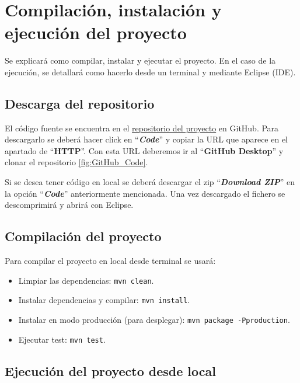 
\section{Compilación, instalación y ejecución del proyecto}

Se explicará como compilar, instalar y ejecutar el proyecto. En el caso de
la ejecución, se detallará como hacerlo desde un terminal y mediante Eclipse (IDE).

\subsection{Descarga del repositorio}
El código fuente se encuentra en el \href{https://github.com/drg1006/Gestor-TFG-2022.git}{repositorio del proyecto} en GitHub. Para descargarlo se deberá hacer click en ``\textbf{\textit{Code}}'' y copiar la URL que aparece en el apartado de ``\textbf{HTTP}''. Con esta URL deberemos ir al ``\textbf{GitHub Desktop}'' y clonar el repositorio \ref{fig:GitHub_Code}.


Si se desea tener código en local se deberá descargar el zip ``\textbf{\textit{Download ZIP}}'' en la opción ``\textbf{\textit{Code}}'' anteriormente mencionada. Una vez descargado el fichero se descomprimirá y abrirá con Eclipse. 

\subsection{Compilación del proyecto}

Para compilar el proyecto en local desde terminal se usará:
\begin{itemize}
	\item Limpiar las dependencias: \texttt{mvn clean}.
	\item Instalar dependencias y compilar: \texttt{mvn install}.
	\item Instalar en modo producción (para desplegar): \texttt{mvn package -Pproduction}.  
	\item Ejecutar test: \texttt{mvn test}.	
\end{itemize}

\subsection{Ejecución del proyecto desde local}

